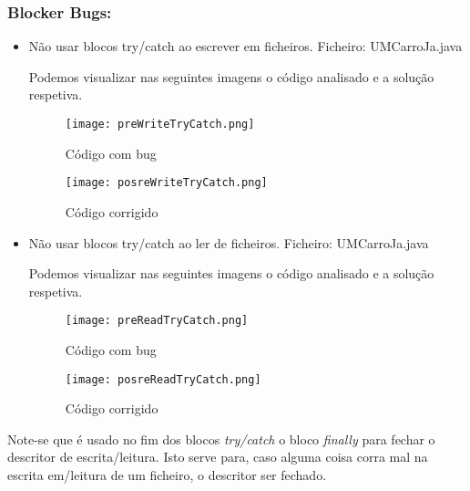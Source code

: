 \subsubsection{Blocker Bugs:}
\begin{itemize}
\item Não usar blocos try/catch ao escrever em ficheiros.\newline
 Ficheiro: UMCarroJa.java\newline


\par Podemos visualizar nas seguintes imagens o código analisado e a solução respetiva.

\begin{figure}[H]

  \centering

  \texttt{[image: preWriteTryCatch.png]}

  \caption {Código com bug}

  \label {fig02}

\end{figure}

\begin{figure}[H]

  \centering

  \texttt{[image: posreWriteTryCatch.png]}

  \caption {Código corrigido}

  \label {fig03}

\end{figure}

\item Não usar blocos try/catch ao ler de ficheiros.\newline
 Ficheiro: UMCarroJa.java\newline


\par Podemos visualizar nas seguintes imagens o código analisado e a solução respetiva.


\begin{figure}[H]

  \centering

  \texttt{[image: preReadTryCatch.png]}

  \caption {Código com bug}

  \label {fig04}

\end{figure}

\begin{figure}[H]

  \centering

  \texttt{[image: posreReadTryCatch.png]}

  \caption {Código corrigido}

  \label {fig05}

\end{figure}

\end{itemize}
\par Note-se que é usado no fim dos blocos \textit{try/catch} o bloco \textit{finally} para fechar o descritor de escrita/leitura. Isto serve para, caso alguma coisa corra mal na escrita em/leitura de um ficheiro, o descritor ser fechado. 

